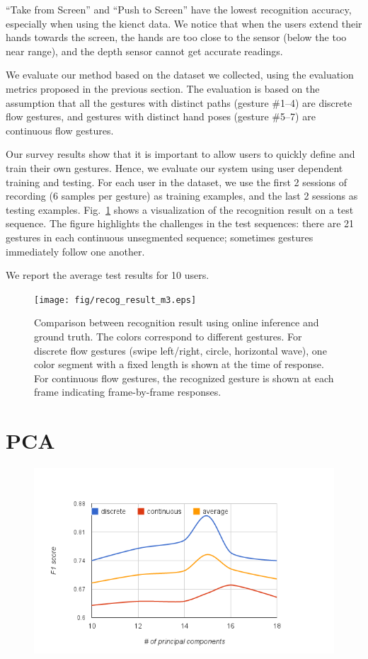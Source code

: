 ``Take from Screen'' and ``Push to Screen'' have the lowest recognition
accuracy, especially when using the kienct data. We notice that when the users
extend their hands towards the screen, the hands are too close to the sensor
(below the too near range), and the depth sensor cannot get accurate readings.

We evaluate our method based on the dataset we collected, using the
evaluation metrics proposed in the previous section. The evaluation is based
on the assumption that all the gestures with distinct paths (gesture \#1--4)
are discrete flow gestures, and gestures with distinct hand poses (gesture
\#5--7) are continuous flow gestures. 

Our survey results show that it is
important to allow users to quickly define and train their own gestures. Hence,
we evaluate our system using user dependent training and testing. For each user
in the dataset, we use the first 2 sessions of recording (6 samples per gesture)
as training examples, and the last 2 sessions as testing examples.
Fig.~\ref{fig:recog-result} shows a visualization of the recognition result on a
test sequence. The figure highlights the challenges in the test sequences:
there are 21 gestures in each continuous unsegmented sequence; sometimes
gestures immediately follow one another.

We report the average test results for 10 users.

\begin{figure}[t]
\centering
\texttt{[image: fig/recog\_result\_m3.eps]}
\caption{Comparison between recognition result using online inference
and ground truth.
The colors correspond to different gestures. For discrete flow gestures
(swipe left/right, circle, horizontal wave), one color segment with a fixed
length is shown at the time of response. For continuous flow gestures, the
recognized gesture is shown at each frame indicating frame-by-frame responses.}
\label{fig:recog-result}
\end{figure}

\section{PCA}
\begin{figure}[t]
\centering
\includegraphics[width=\columnwidth]{figures/f1_pca.png}
\end{figure}

